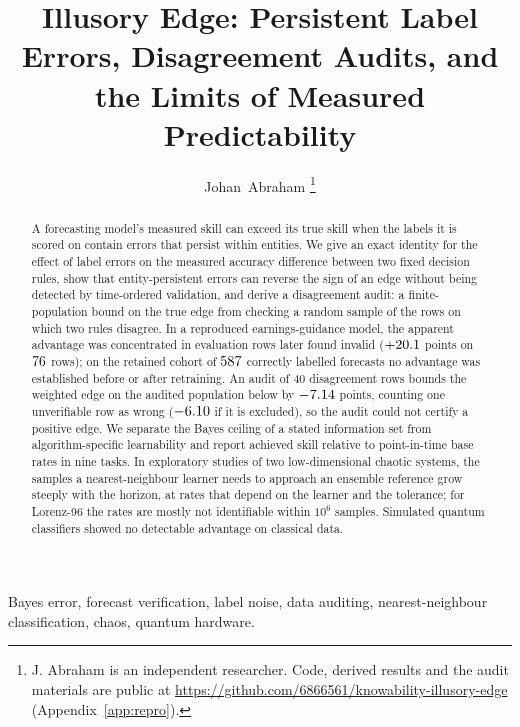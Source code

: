 \documentclass[journal]{IEEEtran}
\theoremstyle{definition}
\begin{document}
\title{Illusory Edge: Persistent Label Errors, Disagreement Audits, and the Limits of Measured Predictability}

\author{Johan~Abraham%
\thanks{J. Abraham is an independent researcher. Code, derived results and the audit materials are public at \url{https://github.com/6866561/knowability-illusory-edge} (Appendix~\ref{app:repro}).}}


\maketitle

\begin{abstract}
A forecasting model's measured skill can exceed its true skill when the labels it is scored on contain errors that persist within entities. We give an exact identity for the effect of label errors on the measured accuracy difference between two fixed decision rules, show that entity-persistent errors can reverse the sign of an edge without being detected by time-ordered validation, and derive a disagreement audit: a finite-population bound on the true edge from checking a random sample of the rows on which two rules disagree. In a reproduced earnings-guidance model, the apparent advantage was concentrated in evaluation rows later found invalid ($+20.1$ points on $76$ rows); on the retained cohort of $587$ correctly labelled forecasts no advantage was established before or after retraining. An audit of 40 disagreement rows bounds the weighted edge on the audited population below by $-7.14$ points, counting one unverifiable row as wrong ($-6.10$ if it is excluded), so the audit could not certify a positive edge. We separate the Bayes ceiling of a stated information set from algorithm-specific learnability and report achieved skill relative to point-in-time base rates in nine tasks. In exploratory studies of two low-dimensional chaotic systems, the samples a nearest-neighbour learner needs to approach an ensemble reference grow steeply with the horizon, at rates that depend on the learner and the tolerance; for Lorenz-96 the rates are mostly not identifiable within $10^6$ samples. Simulated quantum classifiers showed no detectable advantage on classical data.
\end{abstract}

\begin{IEEEkeywords}
Bayes error, forecast verification, label noise, data auditing, nearest-neighbour classification, chaos, quantum hardware.
\end{IEEEkeywords}
\end{document}
